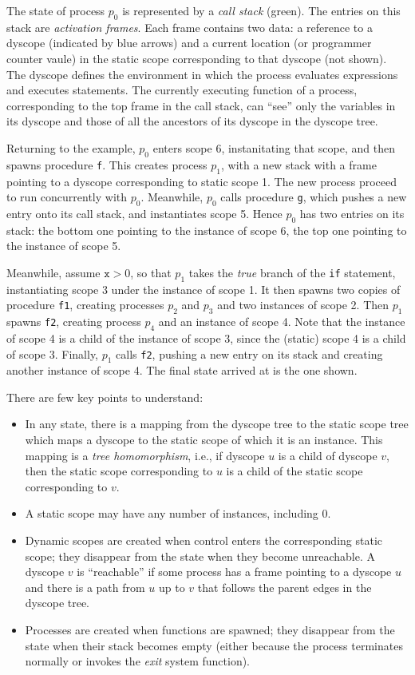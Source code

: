 The state of process $p_0$ is represented by a \emph{call stack}
(green).  The entries on this stack are \emph{activation frames}.
Each frame contains two data: a reference to a dyscope (indicated by
blue arrows) and a current location (or programmer counter vaule) in
the static scope corresponding to that dyscope (not shown).  The
dyscope defines the environment in which the process evaluates
expressions and executes statements.  The currently executing function
of a process, corresponding to the top frame in the call stack, can
``see'' only the variables in its dyscope and those of all the
ancestors of its dyscope in the dyscope tree.

Returning to the example, $p_0$ enters scope 6, instanitating that
scope, and then spawns procedure \texttt{f}.  This creates process
$p_1$, with a new stack with a frame pointing to a dyscope
corresponding to static scope 1.  The new process proceed to run
concurrently with $p_0$.  Meanwhile, $p_0$ calls procedure \texttt{g},
which pushes a new entry onto its call stack, and instantiates scope
5.  Hence $p_0$ has two entries on its stack: the bottom one pointing
to the instance of scope 6, the top one pointing to the instance of
scope 5.

Meanwhile, assume $\texttt{x}>0$, so that $p_1$ takes the \emph{true}
branch of the \texttt{if} statement, instantiating scope 3 under the
instance of scope 1.  It then spawns two copies of procedure
\texttt{f1}, creating processes $p_2$ and $p_3$ and two instances of
scope 2.  Then $p_1$ spawns \texttt{f2}, creating process $p_4$ and an
instance of scope 4.  Note that the instance of scope 4 is a child of
the instance of scope 3, since the (static) scope 4 is a child of
scope 3.  Finally, $p_1$ calls \texttt{f2}, pushing a new entry on its
stack and creating another instance of scope 4.  The final state
arrived at is the one shown.

There are few key points to understand:
\begin{itemize}
\item In any state, there is a mapping from the dyscope tree to the
  static scope tree which maps a dyscope to the static scope of which
  it is an instance.  This mapping is a \emph{tree homomorphism},
  i.e., if dyscope $u$ is a child of dyscope $v$, then the static
  scope corresponding to $u$ is a child of the static scope
  corresponding to $v$.
\item A static scope may have any number of instances, including 0.
\item Dynamic scopes are created when control enters the corresponding
  static scope; they disappear from the state when they become
  unreachable.  A dyscope $v$ is ``reachable'' if some process has a
  frame pointing to a dyscope $u$ and there is a path from $u$ up to
  $v$ that follows the parent edges in the dyscope tree.
\item Processes are created when functions are spawned; they disappear
  from the state when their stack becomes empty (either because the
  process terminates normally or invokes the \emph{exit} system
  function).
\end{itemize}

